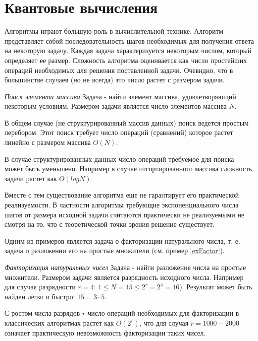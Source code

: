 \chapter{Квантовые вычисления}
Алгоритмы играют большую роль в вычислительной технике. Алгоритм
представляет собой последовательность шагов необходимых для получения
ответа на некоторую задачу. Каждая задача характеризуется некоторым
числом, который определяет ее размер. Сложность алгоритма оценивается
как число 
простейших операций необходимых для решения поставленной
задачи. Очевидно, что в большинстве случаев (но не всегда) это число
растет с размером задачи. 

\begin{example}
\emph{Поиск элемента массива}
\label{exFind}
Задача - найти элемент массива, удовлетворяющий некоторым
условиям. Размером задачи является число элементов массива $N$. 

В общем случае (не структурированный массив данных) поиск ведется
простым перебором. Этот поиск требует число операций (сравнений) которое
растет линейно с размером массива $O\left( N \right)$.

В случае структурированных данных число операций требуемое для поиска
может быть уменьшено. Например в случае отсортированного массива
сложность задачи растет как $O\left(log N\right)$.
\end{example}

Вместе с тем существование алгоритма еще
не гарантирует его практической реализуемости. В частности алгоритмы
требующие экспоненциального числа шагов от размера исходной задачи
считаются практически не реализуемыми не смотря на то, что с
теоретической точки зрения решение существует.

Одним из примеров является задача о факторизации натурального числа,
т. е. задача о разложении его на простые множители (см. пример
\ref{exFactor}).  

\begin{example}
\emph{Факторизация натуральных чисел}
\label{exFactor}
Задача - найти разложение числа на простые множители.
Размером задачи
является разрядность исходного числа. Например для случая разрядности
$r = 4$: $1 \le N = 15 \le 2^r = 2^4 = 16$). Результат может быть
найден легко и быстро: $15 = 3 \cdot 5$. 

С ростом числа разрядов $r$ число операций необходимых для
факторизации в классических алгоритмах растет как
$O\left(2^r\right)$, что для случая $r = 1000 - 2000$ означает практическую
невозможность факторизации таких чисел. 
\end{example}


